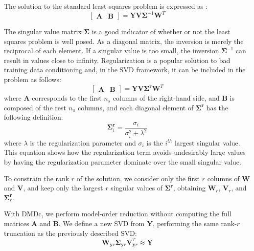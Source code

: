 The solution to the standard least squares problem is expressed as \cite{DMDc}:
\begin{equation}
    \begin{bmatrix}
        \mathbf{A} & \mathbf{B} 
    \end{bmatrix} = \mathbf{Y}\mathbf{V}\mathbf{\Sigma}^{-1}\mathbf{W}^T
\end{equation}

The singular value matrix $\mathbf{\Sigma}$ is a good indicator of whether or not the least squares problem is well posed.
%
As a diagonal matrix, the inversion is merely the reciprocal of each element.
%
If a singular value is too small, the inversion $\mathbf{\Sigma}^{-1}$ can result in values close to infinity.
%
Regularization is a popular solution to bad training data conditioning and, in the SVD framework, it can be included in the problem as follows:
\begin{equation}
    \begin{bmatrix}
        \mathbf{A} & \mathbf{B} 
    \end{bmatrix} = \mathbf{Y}\mathbf{V}\mathbf{\Sigma^r}\mathbf{W}^T
\end{equation}
where $\mathbf{A}$ corresponds to the first $n_s$ columns of the right-hand side, and $\mathbf{B}$ is composed of the rest $n_u$ columns, and each diagonal element of $\mathbf{\Sigma^r}$ has the following definition:
\begin{equation}
   \mathbf{\Sigma}^{\mathbf{r}}_i = \frac{\sigma_i}{\sigma_i^2 + \lambda^2}
\end{equation}
where $\lambda$ is the regularization parameter and $\sigma_i$ is the $i^{th}$ largest singular value.
%
This equation shows how the regularization term avoids undesirably large values by having the regularization parameter dominate over the small singular value.

To constrain the rank $r$ of the solution, we consider only the first $r$ columns of $\mathbf{W}$ and $\mathbf{V}$, and keep only the largest $r$ singular values of $\mathbf{\Sigma}^{\mathbf{r}}$, obtaining $\mathbf{W}_r$, $\mathbf{V}_r$, and $\mathbf{\Sigma}_r^{\mathbf{r}}$.

With DMDc, we perform model-order reduction without computing the full matrices $\mathbf{A}$ and $\mathbf{B}$.
%
We define a new SVD from $\mathbf{Y}$, performing the same rank-$r$ truncation as the previously described SVD:
\begin{equation} \label{eqn:pod_in_dmd}
\mathbf{W}_{\mathbf{y}r}\mathbf{\Sigma}_{\mathbf{y}r}\mathbf{V}_{\mathbf{y}r}^T \approx \mathbf{Y}
\end{equation}

